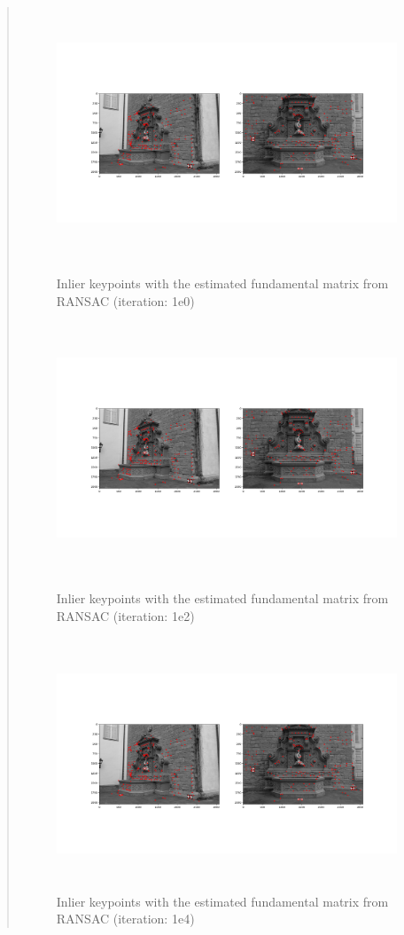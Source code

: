 \documentclass[11pt]{article}
\begin{document}
\begin{quote}
\begin{figure}[h]
    \centering
    \includegraphics[height=7.5cm]{ransac_num_iter_1e0.png} %
    \caption{Inlier keypoints with the estimated fundamental matrix from RANSAC (iteration: 1e0)}
    \includegraphics[height=7.5cm]{ransac_num_iter_1e2.png}
    \caption{Inlier keypoints with the estimated fundamental matrix from RANSAC (iteration: 1e2)}
    \includegraphics[height=7.5cm]{ransac_num_iter_1e4.png}
    \caption{Inlier keypoints with the estimated fundamental matrix from RANSAC (iteration: 1e4)}
    \label{fig:ransac}
\end{figure}



\end{quote}
\end{document}
